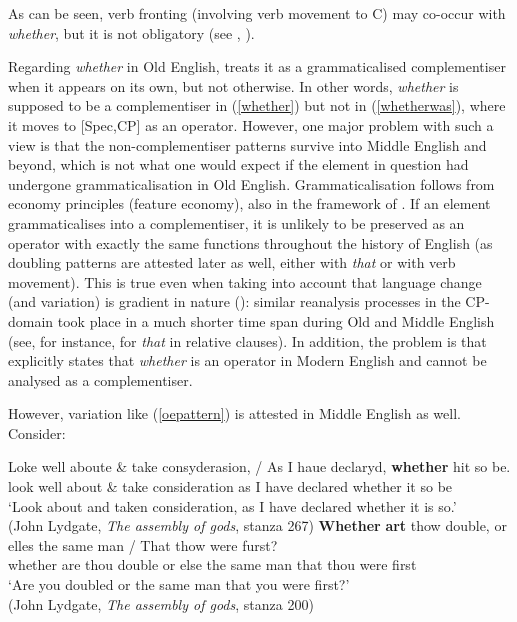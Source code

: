 As can be seen, verb fronting (involving verb movement to C) may co-occur with \textit{whether}, but it is not obligatory (see \citealt{fischer1992}, \citealt{vangelderen2009}).

Regarding \textit{whether} in Old English, \citet{vangelderen2009} treats it as a grammaticalised complementiser when it appears on its own, but not otherwise. In other words, \textit{whether} is supposed to be a complementiser in (\ref{whether}) but not in (\ref{whetherwas}), where it moves to [Spec,CP] as an operator. However, one major problem with such a view is that the non-complementiser patterns survive into Middle English and beyond, which is not what one would expect if the element in question had undergone grammaticalisation in Old English. Grammaticalisation follows from economy principles (feature economy), also in the framework of \citet{vangelderen2009}. If an element grammaticalises into a complementiser, it is unlikely to be preserved as an operator with exactly the same functions throughout the history of English (as doubling patterns are attested later as well, either with \textit{that} or with verb movement). This is true even when taking into account that language change (and variation) is gradient in nature (\citealt{traugotttrousdale2010}): similar reanalysis processes in the CP-domain took place in a much shorter time span during Old and Middle English (see, for instance, \citealt{vangelderen2009} for \textit{that} in relative clauses). In addition, the problem is that \citet[156]{vangelderen2009} explicitly states that \textit{whether} is an operator in Modern English and cannot be analysed as a complementiser.

However, variation like (\ref{oepattern}) is attested in Middle English as well. Consider:

\ea
\ea \gll Loke well aboute \& take consyderasion, / As I haue declaryd, \textbf{whether} hit so be.\\
look well about \& take consideration as I have declared whether it so be\\
\glt `Look about and taken consideration, {} as I have declared whether it is so.'\\(John Lydgate, \textit{The assembly of gods}, stanza 267)
\ex \gll \textbf{Whether} \textbf{art} thow double, or elles the same man / That thow were furst? \label{lydgatevmove}\\
whether are thou double or else the same man {} that thou were first\\
\glt `Are you doubled or the same man that you were first?'\\(John Lydgate, \textit{The assembly of gods}, stanza 200)
\z
\z

